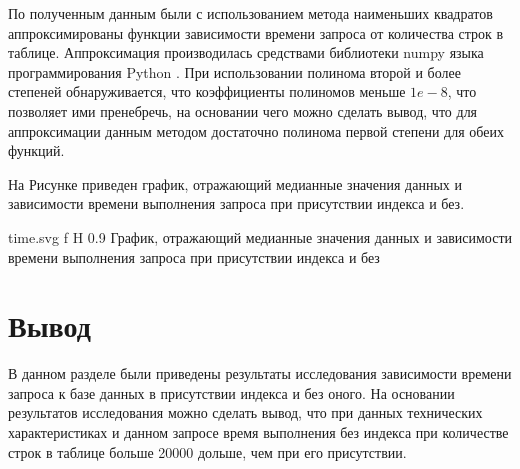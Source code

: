 По полученным данным были с использованием метода наименьших квадратов аппроксимированы функции зависимости времени запроса от количества строк в таблице. Аппроксимация производилась средствами библиотеки numpy языка программирования Python \cite{numpy}.
При использовании полинома второй и более степеней обнаруживается, что коэффициенты полиномов меньше $1e-8$, что позволяет ими пренебречь, на основании чего можно сделать вывод, что для аппроксимации данным методом достаточно полинома первой степени для обеих функций.

На Рисунке приведен график, отражающий медианные значения данных и зависимости времени выполнения запроса при присутствии индекса и без.

\myincludesvg
{time.svg} 
{f} 
{H} 
{0.9\textwidth} 
{График, отражающий медианные значения данных и зависимости времени выполнения запроса при присутствии индекса и без}

\section*{Вывод}

В данном разделе были приведены результаты исследования зависимости времени запроса к базе данных в присутствии индекса и без оного.
На основании результатов исследования можно сделать вывод, что при данных технических характеристиках и данном запросе время выполнения без индекса при количестве строк в таблице больше 20000 дольше, чем при его присутствии.
